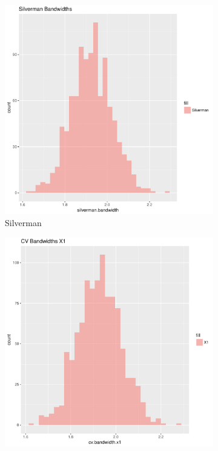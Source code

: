 \begin{figure}[htbp]
    \centering
    \begin{subfigure}[b]{0.3\textwidth}
    \includegraphics[width=\textwidth]{results/unif_100_unif/output/bandwidths-silverman}
    \caption{Silverman}
    \label{fig:bandwidths_x1:unif_100_unif:s}
    \end{subfigure}
    \begin{subfigure}[b]{0.3\textwidth}
    \includegraphics[width=\textwidth]{results/unif_100_unif/output/bandwidths-x1}

\end{subfigure}
\end{figure}
